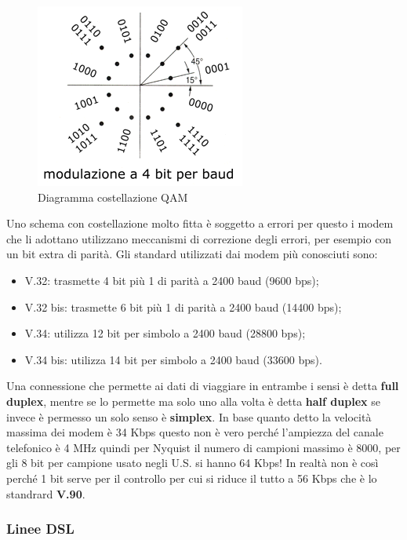 \begin{figure}[htbp]
\centering
\includegraphics[scale=1]{images/qam.png}
\caption{Diagramma costellazione QAM}
\end{figure}

Uno schema con costellazione molto fitta è soggetto a errori per questo i modem che li adottano utilizzano meccanismi di correzione degli errori, per esempio con un bit extra di parità.
Gli standard utilizzati dai modem più conosciuti sono:

\begin{itemize}

\item{V.32: trasmette 4 bit più 1 di parità a 2400 baud (9600 bps)};
\item{V.32 bis: trasmette 6 bit più 1 di parità a 2400 baud (14400 bps)};
\item{V.34: utilizza 12 bit per simbolo a 2400 baud (28800 bps)};
\item{V.34 bis: utilizza 14 bit per simbolo a 2400 baud (33600 bps)}.

\end{itemize}

Una connessione che permette ai dati di viaggiare in entrambe i sensi è detta \textbf{full duplex}, mentre se lo permette ma solo uno alla volta è detta \textbf{half duplex} se invece è permesso un solo senso è \textbf{simplex}. In base quanto detto la velocità massima dei modem è 34 Kbps questo non è vero perché l'ampiezza del canale telefonico è 4 MHz quindi per Nyquist il numero di campioni massimo è 8000, per gli 8 bit per campione usato negli U.S. si hanno 64 Kbps! In realtà non è così perché 1 bit serve per il controllo per cui si riduce il tutto a 56 Kbps che è lo standrard\textbf{ V.90}.

\subsubsection*{Linee DSL}

